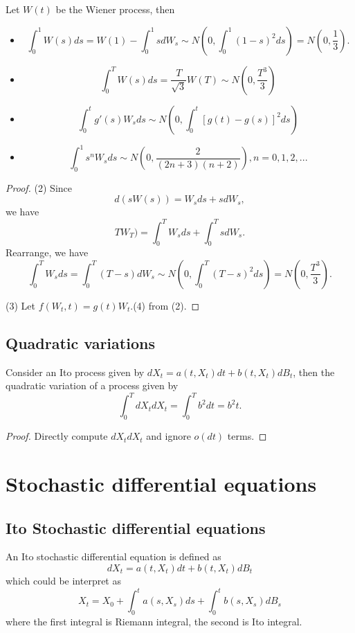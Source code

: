 \begin{refsection}
\begin{corollary}
	Let $W(t)$ be the Wiener process, then
	\begin{itemize}
		\item $$\int_0^1 W(s)ds = W(1) - \int_0^1 sdW_s \sim N(0,\int_0^1 (1-s)^2 ds) = N(0,\frac{1}{3}).$$
		\item $$\int_0^T W(s)ds = \frac{T}{\sqrt{3}}W(T) \sim N(0,\frac{T^3}{3})$$
		\item $$\int_0^t g'(s)W_s ds \sim N(0,\int_0^t [g(t)-g(s)]^2ds)$$
		\item $$\int_0^1 s^n W_s ds \sim N(0,\frac{2}{(2n+3)(n+2)}),n=0,1,2,...$$
	\end{itemize}	
\end{corollary}
\begin{proof}
	(2)
	Since
	$$d(sW(s)) = W_s ds + s dW_s,$$
	we have
	$$TW_T) = \int_0^T W_s ds + \int_0^Ts dW_s.$$
	Rearrange, we have
	$$\int_0^T W_s ds = \int_0^T (T-s)dW_s \sim N(0, \int_0^T (T-s)^2ds) = N(0, \frac{T^3}{3}).$$
	
	(3) Let $f(W_t,t) = g(t)W_t$.(4) from (2).
\end{proof}

\subsection{Quadratic variations}
\begin{lemma}
	Consider an Ito process given by $dX_t = a(t,X_t)dt + b(t,X_t)dB_t$, then
	the quadratic variation of a process given by
	$$\int_0^T dX_tdX_t = \int_0^T b^2 dt = b^2t.$$
\end{lemma}
\begin{proof}
	Directly compute $dX_tdX_t$ and ignore $o(dt)$ terms. 
\end{proof}

\section{Stochastic differential equations}
\subsection{Ito Stochastic differential equations}
\begin{definition}
	\cite[137]{mikosch1998elementary}An Ito stochastic differential equation is defined as
	$$dX_t = a(t,X_t)dt + b(t,X_t)dB_t$$
	which could be interpret as
	$$X_t = X_0 + \int_0^t a(s,X_s)ds + \int_0^t b(s,X_s)dB_s$$
	where the first integral is Riemann integral, the second is Ito integral.
\end{definition}


\end{refsection}
